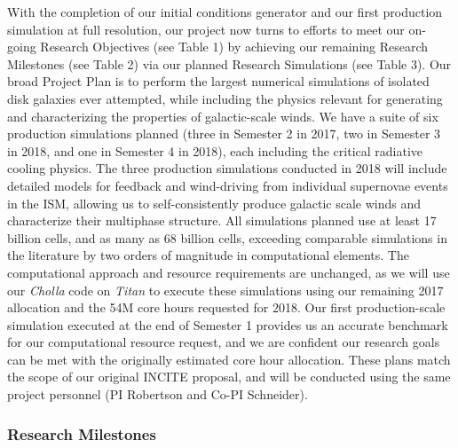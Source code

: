 \documentclass[11pt,letterpaper,english]{article}
\begin{document}
With the completion of our initial conditions generator and our first production simulation at full resolution, 
our project now turns to efforts to meet our on-going Research Objectives (see Table 1) by achieving our
remaining Research Milestones (see Table 2) via our planned Research Simulations (see Table 3). Our broad Project Plan is
to perform the largest numerical simulations of isolated disk galaxies ever attempted, while including the physics
relevant for generating and characterizing the properties of galactic-scale winds. We have a suite of six
production simulations planned (three in Semester 2 in 2017, two in Semester 3 in 2018, and one in Semester 4 in 2018),
each including the critical radiative cooling physics. The three production simulations conducted in 2018 will include 
detailed models for feedback and wind-driving from individual supernovae events in the ISM, allowing us to self-consistently
produce galactic scale winds and characterize their multiphase structure. All simulations planned use at least 17 billion
cells, and as many as 68 billion cells, exceeding comparable simulations in the literature by two orders of magnitude 
in computational elements. The computational approach and resource requirements are unchanged, as we will use our \textit{Cholla}
code on \textit{Titan} to execute these simulations using our remaining 2017 allocation and the 54M core hours requested
for 2018. Our first production-scale simulation executed at the end of Semester 1 provides us an accurate benchmark for
our computational resource request, and we are confident our research goals can be met with the originally estimated
core hour allocation.
These plans match the scope of our original INCITE proposal, and will be conducted using the
same project personnel (PI Robertson and Co-PI Schneider). 


\subsubsection{Research Milestones}
\end{document}
